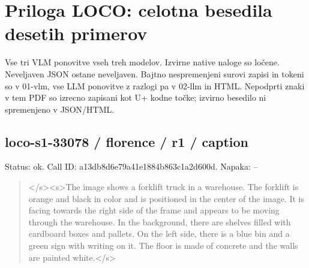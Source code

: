 \documentclass[10pt,a4paper]{article}
\begin{document}
\section*{Priloga LOCO: celotna besedila desetih primerov}
Vse tri VLM ponovitve vseh treh modelov. Izvirne native naloge so ločene. Neveljaven JSON ostane neveljaven. Bajtno nespremenjeni surovi zapisi in tokeni so v 01-vlm, vse LLM ponovitve z razlogi pa v 02-llm in HTML. Nepodprti znaki v tem PDF so izrecno zapisani kot U+ kodne točke; izvirno besedilo ni spremenjeno v JSON/HTML.

\subsection*{loco-s1-33078 / florence / r1 / caption}
Status: ok. Call ID: a13db8d6e79a41e1884b863c1a2d600d. Napaka: --
\begin{quote}\footnotesize
</s>\allowbreak{}<s>\allowbreak{}The image shows a forklift truck in a warehouse. The forklift is orange and black in color and is positioned in the center of the image. It is facing towards the right side of the frame and appears to be moving through the warehouse. In the background,\allowbreak{} there are shelves filled with cardboard boxes and pallets. On the left side,\allowbreak{} there is a blue bin and a green sign with writing on it. The floor is made of concrete and the walls are painted white.</s>\allowbreak{}
\end{quote}
\end{document}
